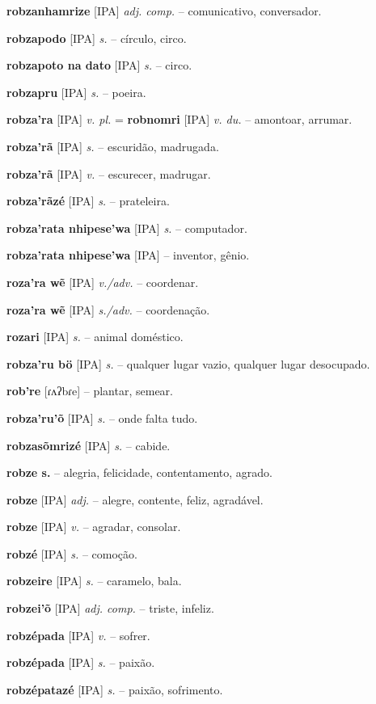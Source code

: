 \textbf{robzanhamrize} [IPA] \textit{adj. comp.} -- comunicativo, conversador.

\textbf{robzapodo} [IPA] \textit{s.} -- círculo, circo.

\textbf{robzapoto na dato} [IPA] \textit{s.} -- circo.

\textbf{robzapru} [IPA] \textit{s.} -- poeira.

\textbf{robza'ra} [IPA] \textit{v. pl.} = \textbf{robnomri} [IPA] \textit{v. du.} -- amontoar, arrumar.

\textbf{robza'rã} [IPA] \textit{s.} -- escuridão, madrugada.

\textbf{robza'rã} [IPA] \textit{v.} -- escurecer, madrugar.

\textbf{robza'rãzé} [IPA] \textit{s.} -- prateleira.

\textbf{robza'rata nhipese'wa} [IPA] \textit{s.} -- computador.

\textbf{robza'rata nhipese'wa} [IPA] \textit{} -- inventor, gênio.

\textbf{roza'ra wẽ} [IPA] \textit{v./adv.} -- coordenar.

\textbf{roza'ra wẽ} [IPA] \textit{s./adv.} -- coordenação.

\textbf{rozari} [IPA] \textit{s.} -- animal doméstico.

\textbf{robza'ru bö} [IPA] \textit{s.} -- qualquer lugar vazio, qualquer lugar desocupado.

\textbf{rob're} [ɾʌʔbɾe] -- plantar, semear.

\textbf{robza'ru'õ} [IPA] \textit{s.} -- onde falta tudo.

\textbf{robzasõmrizé} [IPA] \textit{s.} -- cabide.

\textbf{robze s.} -- alegria, felicidade, contentamento, agrado.

\textbf{robze} [IPA] \textit{adj.} -- alegre, contente, feliz, agradável.

\textbf{robze} [IPA] \textit{v.} -- agradar, consolar.

\textbf{robzé} [IPA] \textit{s.} -- comoção.

\textbf{robzeire} [IPA] \textit{s.} -- caramelo, bala.

\textbf{robzei'õ} [IPA] \textit{adj. comp.} -- triste, infeliz.

\textbf{robzépada} [IPA] \textit{v.} -- sofrer.

\textbf{robzépada} [IPA] \textit{s.} -- paixão.

\textbf{robzépatazé} [IPA] \textit{s.} -- paixão, sofrimento.


